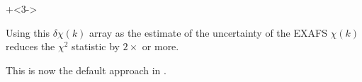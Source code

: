 \begin{frame}
\begin{cenpage}{135mm}
\begin{columns}
\begin{column}[T]{60mm}
      {}

    \end{column}

\end{columns}

\vmm

{\onslide+<3-> {

\begin{cenpage}{105mm}

  Using this $\delta\chi(k)$ array as the estimate of the uncertainty of
  the EXAFS $\chi(k)$ reduces the $\chi^2$ statistic by $2\times$ or more.
  \vmm

    This is now the default approach in {\larch}.

\end{cenpage}

}}

\end{cenpage}
\end{frame}

